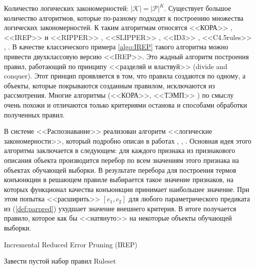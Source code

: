 \documentclass[12pt]{article}
\begin{document}
Количество логических закономерностей: \(\lvert \mathcal{K} \rvert =
\lvert \mathcal{P} \rvert^{K}\). Существует большое количество
алгоритмов, которые по-разному подходят к построению множества
логических закономерностей. К таким алгоритмам относятся <<КОРА>>
\cite{vainzvaig73kora}, <<IREP>> и <<RIPPER>> \cite{cohen95fast},
<<SLIPPER>> \cite{cohen99simple}, <<ID3>> \cite{quinlan86induction},
<<C4.5rules>> \cite{quinlan93programs}, \cite{quinlan96bagging}.  В
качестве классического примера \ref{algo:IREP} такого алгоритма можно
привести двухклассовую версию <<IREP>>. Это жадный алгоритм построения
правил, работающий по принципу <<разделяй и властвуй>> (divide and
conquer). Этот принцип проявляется в том, что правила создаются по
одному, а объекты, которые покрываются созданным правилом, исключаются
из рассмотрения. Многие алгоритмы (<<КОРА>>, <<ТЭМП>>
\cite{voron10logicalgs}) по смыслу очень похожи и отличаются только
критериями останова и способами обработки полученных правил.

В системе <<Распознавание>> реализован алгоритм <<логические
закономерности>>, который подробно описан в работах \cite{kovshov08},
\cite{ryazanov07logic}, \cite{recognition06}. Основная идея этого
алгоритма заключается в следующем: для каждого признака из
признакового описания объекта производится перебор по всем значениям
этого признака на объектах обучающей выборки. В результате перебора
для построения термов конъюнкции в решающем правиле выбирается такое
значение признаков, на которых функционал качества конъюнкции
принимает наибольшее значение. При этом попытка <<расширить>> \([c_1,
  c_2]\) для любого параметрического предиката из (\ref{def:parpred})
ухудшает значение внешнего критерия. В итоге получается правило,
которое как бы <<натянуто>> на некоторые объекты обучающей выборки.

\begin{algorithm}[\text]
  \caption{Incremental Reduced Error Pruning (IREP)}\label{algo:IREP}
   {
    Завести пустой набор правил Ruleset\;
    \;
  }
\end{algorithm}
\end{document}
